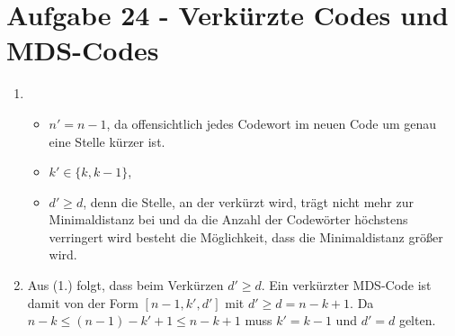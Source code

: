 \section*{Aufgabe 24 - Verkürzte Codes und MDS-Codes}
\begin{enumerate}
	\item
		\begin{itemize}
		\item $n' = n - 1$, da offensichtlich jedes Codewort im neuen
		Code um genau eine Stelle kürzer ist.
		\item $k' \in \{k, k-1\}$, 
		\item $d' \geq d$, denn die Stelle, an der verkürzt wird, trägt
		nicht mehr zur Minimaldistanz bei und da die Anzahl der
		Codewörter höchstens verringert wird besteht die Möglichkeit,
		dass die Minimaldistanz größer wird.
		\end{itemize}
	\item
		Aus (1.) folgt, dass beim Verkürzen $d' \geq d$. Ein verkürzter
		MDS-Code ist damit von der Form $[n-1, k', d']$ mit $d' \geq d
		= n - k + 1$. Da $n - k \leq (n - 1) - k' + 1 \leq n - k + 1$ muss $k' = k
		- 1$ und $d' = d$ gelten.
\end{enumerate}
